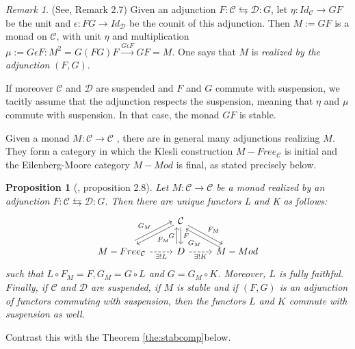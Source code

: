 \documentclass{article}
\newcommand{\cC}{\mathcal{C}}
\newtheorem{proposition}[theorem]{Proposition}
\theoremstyle{definition}
\theoremstyle{remark}
\newtheorem{remark}[theorem]{Remark}
\begin{document}
\begin{remark}(See, \cite{balmer:septrcat} Remark 2.7)%
    Given an adjunction $F:\mathcal{C} \leftrightarrows \mathcal{D}: G$, let $\eta: Id_{\mathcal{C}} \rightarrow GF$ be the unit and $\epsilon:FG \rightarrow Id_{\mathcal{D}}$ be the counit of this adjunction. Then $M:=GF$ is a monad on $\mathcal{C}$, with unit $\eta$ and multiplication $\mu:=G\epsilon F:M^{2}=G(FG)F \xrightarrow{G \epsilon F} GF=M$. One says that $M$ is \textit{realized by the adjunction} $(F,G)$. 
    
   
    
    If moreover $\mathcal{C}$ and $\mathcal{D}$ are suspended and $F$ and $G$ commute with suspension, we tacitly assume that the adjunction respects the suspension, meaning that $\eta$ and $\mu$ commute with suspension. In that case, the monad $GF$ is stable.
\end{remark}

Given a monad $M:\cC \rightarrow \cC$ , there are in general many adjunctions realizing $M$. They form a category in which the Klesli construction $M-Free_{\mathcal{C}}$ is initial and the Eilenberg-Moore category $M-Mod$ is final, as stated precisely below.

\begin{proposition}[\cite{balmer:septrcat}, proposition 2.8] \label{pro:kleisliem}
Let $M:\cC \rightarrow \cC$  be a monad  \textit{realized by an adjunction }$F:\mathcal{C} \leftrightarrows \mathcal{D}: G$. Then there are unique functors L and K as follows: \[\begin{tikzcd}
 & \cC \arrow[dl,"F_{M}"] \arrow[dr,"F_{M}"] \arrow[d,"F"] \\
 M-Free_{\cC} \arrow[dashrightarrow,r,"\exists !L"below] \arrow[ur,"G_{M}",shift left=1ex] & D \arrow[dashrightarrow,r,"\exists !K"below] \arrow[u,"G",shift left=1ex]& M-Mod \arrow[ul, "G_{M}",shift left=1ex] 
\end{tikzcd}
\]
such that $L \circ F_{M}=F, G_{M}=G \circ L$
and $G=G_{M} \circ K$. Moreover, $L$ is fully faithful. 
Finally, if $\mathcal{C}$ and $\mathcal{D}$ are suspended, if $M$ is stable and if $(F,G)$ is an adjunction of functors commuting with suspension, then the functors $L$ and $K$ commute with suspension as well.

\end{proposition}
Contrast this with the Theorem \ref{the:stabcomp}below.
\end{document}
